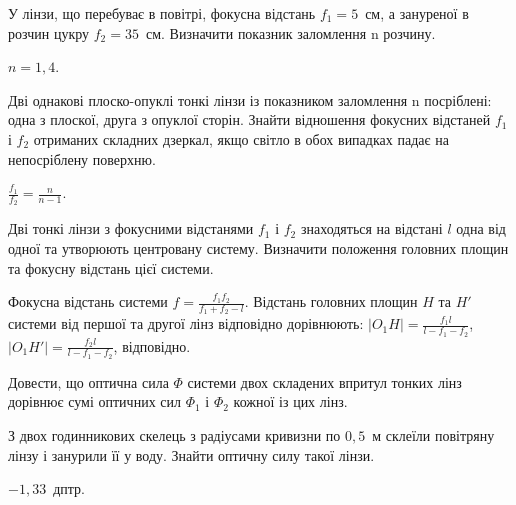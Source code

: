\begin{problem}%
У лінзи, що перебуває в повітрі, фокусна відстань $f_1 = 5$~см, а
зануреної в розчин цукру $f_2 = 35$~см. Визначити показник заломлення n
розчину.
\begin{solution}
	$n = 1,4$.
\end{solution}
\end{problem}

\begin{problem}%
Дві однакові плоско-опуклі тонкі лінзи із показником заломлення n
посріблені: одна з плоскої, друга з опуклої сторін. Знайти відношення
фокусних відстаней $f_1$ і $f_2$ отриманих складних дзеркал, якщо світло в
обох випадках падає на непосріблену поверхню.
\begin{solution}
	$\frac{f_1}{f_2} = \frac{n}{n - 1}$.
\end{solution}
\end{problem}


\begin{problem}%
Дві тонкі лінзи з фокусними відстанями $f_1$ і $f_2$ знаходяться на відстані
$l$ одна від одної та утворюють центровану систему. Визначити
положення головних площин та фокусну відстань цієї системи.
\begin{solution}
	Фокусна відстань системи $f = \frac{f_1f_2}{f_1 + f_2 - l}$.  Відстань головних площин $H$ та $H'$ системи від першої та другої лінз відповідно дорівнюють: $|O_1H| = \frac{f_1l}{l - f_1 - f_2}$, $|O_1H'| = \frac{f_2l}{l - f_1 - f_2}$, відповідно.
\end{solution}
\end{problem}


\begin{problem}%
Довести, що оптична сила $\Phi$ системи двох складених впритул тонких
лінз дорівнює сумі оптичних сил $\Phi_1$ і $\Phi_2$ кожної із цих лінз.
\end{problem}


\begin{problem}%
З двох годинникових скелець з радіусами кривизни по $0,5$~м склеїли
повітряну лінзу і занурили її у воду. Знайти оптичну силу такої лінзи.
\begin{solution}
	$-1,33$~дптр.
\end{solution}
\end{problem}

